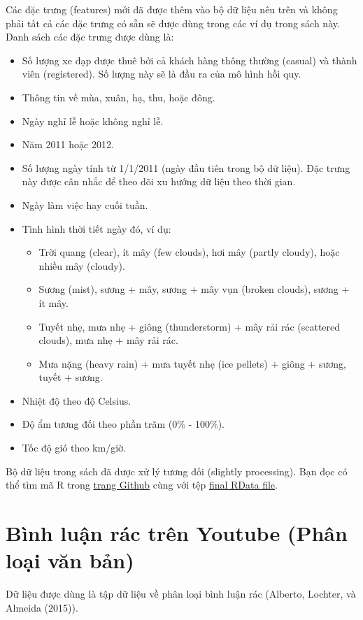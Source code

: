 Các đặc trưng (features) mới đã được thêm vào bộ dữ liệu nêu trên và không phải tất cả các đặc trưng có sẵn sẽ được dùng trong các ví dụ trong sách này. Danh sách các đặc trưng được dùng là:
\begin{itemize}
    \item Số lượng xe đạp được thuê bởi cả khách hàng thông thường (casual) và thành viên (registered). Số lượng này sẽ là đầu ra của mô hình hồi quy. 
    \item Thông tin về mùa, xuân, hạ, thu, hoặc đông.
    \item Ngày nghỉ lễ hoặc không nghỉ lễ. 
    \item Năm 2011 hoặc 2012.
    \item Số lượng ngày tính từ 1/1/2011 (ngày đầu tiên trong bộ dữ liệu). Đặc trưng này được cân nhắc để theo dõi xu hướng dữ liệu theo thời gian.
    \item Ngày làm việc hay cuối tuần. 
    \item Tình hình thời tiết ngày đó, ví dụ:
    \begin{itemize}
        \item Trời quang (clear), ít mây (few clouds), hơi mây (partly cloudy), hoặc nhiều mây (cloudy).
        \item Sương (mist), sương + mây, sương + mây vụn (broken clouds), sương + ít mây.
        \item Tuyết nhẹ, mưa nhẹ + giông (thunderstorm) + mây rải rác (scattered clouds), mưa nhẹ + mây rải rác.
        \item Mưa nặng (heavy rain) + mưa tuyết nhẹ (ice pellets) + giông + sương, tuyết + sương.
    \end{itemize}
    \item Nhiệt độ theo độ Celsius.
    \item Độ ẩm tương đối theo phần trăm (0\% -  100\%).
    \item Tốc độ gió theo km/giờ.
\end{itemize}
Bộ dữ liệu trong sách đã được xử lý tương đối (slightly processing). Bạn đọc có thể tìm mã R trong \href{https://github.com/christophM/interpretable-ml-book/blob/master/R/get-bike-sharing-dataset.R}{trang Github} cùng với tệp \href{https://github.com/christophM/interpretable-ml-book/blob/master/data/bike.RData}{final RData file}.

\section{Bình luận rác trên Youtube (Phân loại văn bản)}
Dữ liệu được dùng là tập dữ liệu về phân loại bình luận rác (Alberto, Lochter, và Almeida (2015)).

